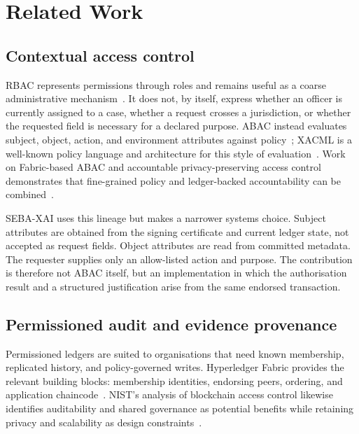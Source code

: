 \section{Related Work}
\label{sec:related}

\subsection{Contextual access control}

RBAC represents permissions through roles and remains useful as a coarse
administrative mechanism~\cite{sandhu_rbac_1996}. It does not, by itself,
express whether an officer is currently assigned to a case, whether a request
crosses a jurisdiction, or whether the requested field is necessary for a
declared purpose. ABAC instead evaluates subject, object, action, and
environment attributes against policy~\cite{nist_abac_2014}; XACML is a
well-known policy language and architecture for this style of
evaluation~\cite{oasis_xacml_2013}. Work on Fabric-based ABAC and accountable
privacy-preserving access control demonstrates that fine-grained policy and
ledger-backed accountability can be combined~\cite{zhao_fabric_abac_2022,hu_accountable_private_ac_2024}.

SEBA-XAI uses this lineage but makes a narrower systems choice. Subject
attributes are obtained from the signing certificate and current ledger state,
not accepted as request fields. Object attributes are read from committed
metadata. The requester supplies only an allow-listed action and purpose. The
contribution is therefore not ABAC itself, but an implementation in which the
authorisation result and a structured justification arise from the same
endorsed transaction.

\subsection{Permissioned audit and evidence provenance}

Permissioned ledgers are suited to organisations that need known membership,
replicated history, and policy-governed writes. Hyperledger Fabric provides the
relevant building blocks: membership identities, endorsing peers, ordering, and
application chaincode~\cite{androulaki_fabric_2018}. NIST's analysis of
blockchain access control likewise identifies auditability and shared
governance as potential benefits while retaining privacy and scalability as
design constraints~\cite{nist_blockchain_access_2022}.

